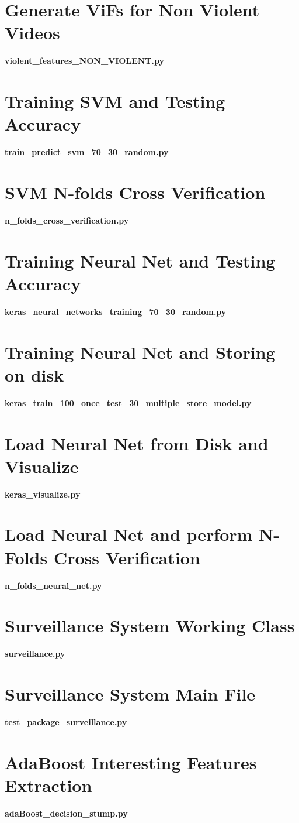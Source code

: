 \begin{appendices}
\section{Generate ViFs for Non Violent Videos}
\textbf{violent\_features\_NON\_VIOLENT.py}

\section{Training SVM and Testing Accuracy}
\textbf{train\_predict\_svm\_70\_30\_random.py}

\section{SVM N-folds Cross Verification}
\textbf{n\_folds\_cross\_verification.py}

\section{Training Neural Net and Testing Accuracy}
\textbf{keras\_neural\_networks\_training\_70\_30\_random.py}

\section{Training Neural Net and Storing on disk}
\textbf{keras\_train\_100\_once\_test\_30\_multiple\_store\_model.py}

\section{Load Neural Net from Disk and Visualize}
\textbf{keras\_visualize.py}

\section{Load Neural Net and perform N-Folds Cross Verification}
\textbf{n\_folds\_neural\_net.py}

\section{Surveillance System Working Class}
\textbf{surveillance.py}

\section{Surveillance System Main File}
\textbf{test\_package\_surveillance.py}

\section{AdaBoost Interesting Features Extraction}
\textbf{adaBoost\_decision\_stump.py}

\end{appendices}